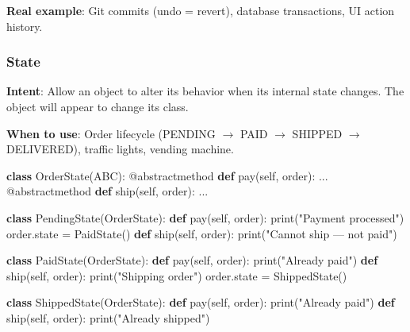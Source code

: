\documentclass[11pt]{article}
\newenvironment{Shaded}{\begin{snugshade}}{\end{snugshade}}
\newcommand{\AttributeTok}[1]{\textcolor[rgb]{0.16,0.50,0.73}{#1}}
\newcommand{\BuiltInTok}[1]{\textcolor[rgb]{0.50,0.55,0.55}{#1}}
\newcommand{\KeywordTok}[1]{\textcolor[rgb]{0.81,0.81,0.76}{\textbf{#1}}}
\newcommand{\NormalTok}[1]{\textcolor[rgb]{0.81,0.81,0.76}{#1}}
\newcommand{\OperatorTok}[1]{\textcolor[rgb]{0.81,0.81,0.76}{#1}}
\newcommand{\StringTok}[1]{\textcolor[rgb]{0.96,0.31,0.31}{#1}}
\newcommand{\VariableTok}[1]{\textcolor[rgb]{0.15,0.68,0.68}{#1}}
\begin{document}
\textbf{Real example}: Git commits (undo = revert), database transactions, UI action history.

\subsubsection{State}\label{state}

\textbf{Intent}: Allow an object to alter its behavior when its internal state changes. The object will appear to change its class.

\textbf{When to use}: Order lifecycle (PENDING \(\rightarrow\) PAID \(\rightarrow\) SHIPPED \(\rightarrow\) DELIVERED), traffic lights, vending machine.


\begin{Shaded}
\begin{Highlighting}[]
\KeywordTok{class}\NormalTok{ OrderState(ABC):}
    \AttributeTok{@abstractmethod}
    \KeywordTok{def}\NormalTok{ pay(}\VariableTok{self}\NormalTok{, order): ...}
    \AttributeTok{@abstractmethod}
    \KeywordTok{def}\NormalTok{ ship(}\VariableTok{self}\NormalTok{, order): ...}

\KeywordTok{class}\NormalTok{ PendingState(OrderState):}
    \KeywordTok{def}\NormalTok{ pay(}\VariableTok{self}\NormalTok{, order):}
        \BuiltInTok{print}\NormalTok{(}\StringTok{"Payment processed"}\NormalTok{)}
\NormalTok{        order.state }\OperatorTok{=}\NormalTok{ PaidState()}
    \KeywordTok{def}\NormalTok{ ship(}\VariableTok{self}\NormalTok{, order):}
        \BuiltInTok{print}\NormalTok{(}\StringTok{"Cannot ship — not paid"}\NormalTok{)}

\KeywordTok{class}\NormalTok{ PaidState(OrderState):}
    \KeywordTok{def}\NormalTok{ pay(}\VariableTok{self}\NormalTok{, order):}
        \BuiltInTok{print}\NormalTok{(}\StringTok{"Already paid"}\NormalTok{)}
    \KeywordTok{def}\NormalTok{ ship(}\VariableTok{self}\NormalTok{, order):}
        \BuiltInTok{print}\NormalTok{(}\StringTok{"Shipping order"}\NormalTok{)}
\NormalTok{        order.state }\OperatorTok{=}\NormalTok{ ShippedState()}

\KeywordTok{class}\NormalTok{ ShippedState(OrderState):}
    \KeywordTok{def}\NormalTok{ pay(}\VariableTok{self}\NormalTok{, order): }\BuiltInTok{print}\NormalTok{(}\StringTok{"Already paid"}\NormalTok{)}
    \KeywordTok{def}\NormalTok{ ship(}\VariableTok{self}\NormalTok{, order): }\BuiltInTok{print}\NormalTok{(}\StringTok{"Already shipped"}\NormalTok{)}


\end{Highlighting}
\end{Shaded}
\end{document}
